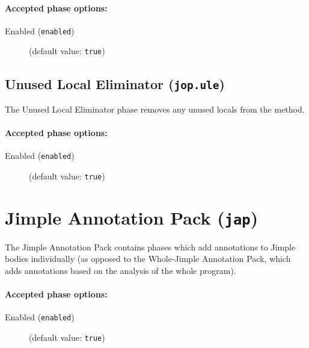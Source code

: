 \documentclass{article}
\begin{document}
\paragraph{Accepted phase options:} 

\begin{description}

\item[Enabled ({\tt enabled})]
(default value: {\tt true})






\end{description}

\subsection{Unused Local Eliminator ({\tt jop.ule})}

The Unused Local Eliminator phase removes any unused locals from
the method.


\paragraph{Accepted phase options:} 

\begin{description}

\item[Enabled ({\tt enabled})]
(default value: {\tt true})






\end{description}

\section{Jimple Annotation Pack ({\tt jap})}

The Jimple Annotation Pack contains phases which add annotations
to Jimple bodies individually (as opposed to the Whole-Jimple
Annotation Pack, which adds annotations based on the analysis of
the whole program).
                        

\paragraph{Accepted phase options:} 

\begin{description}

\item[Enabled ({\tt enabled})]
(default value: {\tt true})






\end{description}
\end{document}
